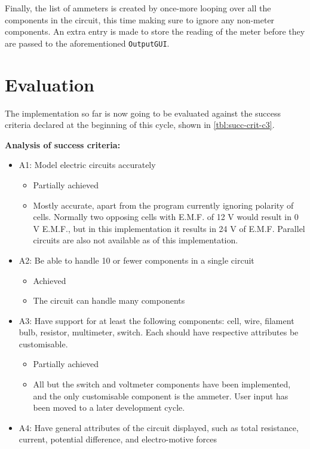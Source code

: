 
    Finally, the list of ammeters is created by once-more looping over all the components in the circuit, this time making sure to ignore any non-meter components.
    An extra entry is made to store the reading of the meter before they are passed to the aforementioned \verb|OutputGUI|.

\section{Evaluation}
    The implementation so far is now going to be evaluated against the success criteria declared at the beginning of this cycle, shown in \autoref{tbl:succ-crit-c3}. 

    \textbf{Analysis of success criteria:}
    \begin{itemize}
        \item A1: Model electric circuits accurately
        \begin{itemize}
            \item Partially achieved
            \item Mostly accurate, apart from the program currently ignoring polarity of cells. Normally two opposing cells with E.M.F. of 12 V would result in 0 V E.M.F., but in this implementation it results in 24 V of E.M.F. Parallel circuits are also not available as of this implementation.
        \end{itemize}
        \item A2: Be able to handle 10 or fewer components in a single circuit
        \begin{itemize}
            \item Achieved
            \item The circuit can handle many components
        \end{itemize}
        \item A3: Have support for at least the following components: cell, wire, filament bulb, resistor, multimeter, switch. Each should have respective attributes be customisable.
        \begin{itemize}
            \item Partially achieved
            \item All but the switch and voltmeter components have been implemented, and the only customisable component is the ammeter. User input has been moved to a later development cycle.
        \end{itemize}
        \item A4: Have general attributes of the circuit displayed, such as total resistance, current, potential difference, and electro-motive forces

\end{itemize}
